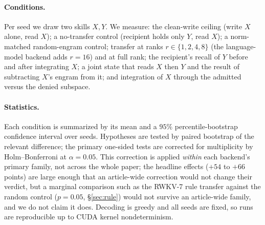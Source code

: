 \documentclass[11pt]{article}
\theoremstyle{definition}
\begin{document}
\paragraph{Conditions.}
Per seed we draw two skills $X,Y$. We measure: the clean-write ceiling (write $X$ alone, read $X$); a no-transfer control (recipient holds only $Y$, read $X$); a norm-matched random-engram control; transfer at ranks $r\in\{1,2,4,8\}$ (the language-model backend adds $r{=}16$) and at full rank; the recipient's recall of $Y$ before and after integrating $X$; a joint state that reads $X$ then $Y$ and the result of subtracting $X$'s engram from it; and integration of $X$ through the admitted versus the denied subspace.

\paragraph{Statistics.}
Each condition is summarized by its mean and a $95\%$ percentile-bootstrap confidence interval over seeds. Hypotheses are tested by paired bootstrap of the relevant difference; the primary one-sided tests are corrected for multiplicity by Holm--Bonferroni at $\alpha=0.05$. This correction is applied \emph{within} each backend's primary family, not across the whole paper; the headline effects ($+54$ to $+66$ points) are large enough that an article-wide correction would not change their verdict, but a marginal comparison such as the RWKV-7 rule transfer against the random control ($p=0.05$, \S\ref{sec:rule}) would not survive an article-wide family, and we do not claim it does. Decoding is greedy and all seeds are fixed, so runs are reproducible up to CUDA kernel nondeterminism.
\end{document}
